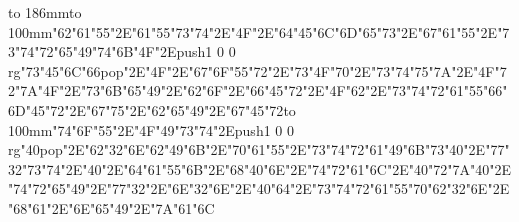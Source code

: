 \hbox to 186mm{\hsize=81mm\vbox to 100mm{\vfill\ipa\char"62\ipa\char"61\ipa\char"55\ipa\char"2E\ipa\char"61\ipa\char"55\ipa\char"73\ipa\char"74\ipa\char"2E\ipa\char"4F\ipa\char"2E\ipa\char"64\ipa\char"45\ipa\char"6C\medskip\ipa\char"6D\ipa\char"65\ipa\char"73\ipa\char"2E\ipa\char"67\ipa\char"61\ipa\char"55\ipa\char"2E\ipa\char"73\ipa\char"74\ipa\char"72\ipa\char"65\ipa\char"49\ipa\char"74\medskip\ipa\char"6B\ipa\char"4F\ipa\char"2E\pdfcolorstack\match push{1 0 0 rg}\ipa\char"73\ipa\char"45\ipa\char"6C\ipa\char"66\pdfcolorstack\match pop{}\ipa\char"2E\ipa\char"4F\ipa\char"2E\ipa\char"67\ipa\char"6F\ipa\char"55\ipa\char"72\ipa\char"2E\ipa\char"73\ipa\char"4F\ipa\char"70\ipa\char"2E\ipa\char"73\ipa\char"74\ipa\char"75\ipa\char"7A\ipa\char"2E\ipa\char"4F\ipa\char"72\ipa\char"7A\medskip\ipa\char"4F\ipa\char"2E\ipa\char"73\ipa\char"6B\ipa\char"65\ipa\char"49\ipa\char"2E\ipa\char"62\ipa\char"6F\ipa\char"2E\ipa\char"66\ipa\char"45\ipa\char"72\ipa\char"2E\ipa\char"4F\ipa\char"62\ipa\char"2E\ipa\char"73\ipa\char"74\ipa\char"72\ipa\char"61\ipa\char"55\ipa\char"66\medskip\ipa\char"6D\ipa\char"45\ipa\char"72\ipa\char"2E\ipa\char"67\ipa\char"75\ipa\char"2E\ipa\char"62\ipa\char"65\ipa\char"49\ipa\char"2E\ipa\char"67\ipa\char"45\ipa\char"72\vfill}\hfill\vbox to 100mm{\vfill\ipa\char"74\ipa\char"6F\ipa\char"55\ipa\char"2E\ipa\char"4F\ipa\char"49\ipa\char"73\ipa\char"74\ipa\char"2E\pdfcolorstack\match push{1 0 0 rg}\ipa\char"40\pdfcolorstack\match pop{}\ipa\char"2E\ipa\char"62\ipa\char"32\ipa\char"6E\medskip\ipa\char"62\ipa\char"49\ipa\char"6B\ipa\char"2E\ipa\char"70\ipa\char"61\ipa\char"55\ipa\char"2E\ipa\char"73\ipa\char"74\ipa\char"72\ipa\char"61\ipa\char"49\ipa\char"6B\medskip\ipa\char"73\ipa\char"40\ipa\char"2E\ipa\char"77\ipa\char"32\ipa\char"73\ipa\char"74\ipa\char"2E\ipa\char"40\ipa\char"2E\ipa\char"64\ipa\char"61\ipa\char"55\ipa\char"6B\ipa\char"2E\ipa\char"68\ipa\char"40\ipa\char"6E\ipa\char"2E\ipa\char"74\ipa\char"72\ipa\char"61\ipa\char"6C\ipa\char"2E\ipa\char"40\ipa\char"72\ipa\char"7A\medskip\ipa\char"40\ipa\char"2E\ipa\char"74\ipa\char"72\ipa\char"65\ipa\char"49\ipa\char"2E\ipa\char"77\ipa\char"32\ipa\char"2E\ipa\char"6E\ipa\char"32\ipa\char"6E\ipa\char"2E\ipa\char"40\ipa\char"64\ipa\char"2E\ipa\char"73\ipa\char"74\ipa\char"72\ipa\char"61\ipa\char"55\ipa\char"70\medskip\ipa\char"62\ipa\char"32\ipa\char"6E\ipa\char"2E\ipa\char"68\ipa\char"61\ipa\char"2E\ipa\char"6E\ipa\char"65\ipa\char"49\ipa\char"2E\ipa\char"7A\ipa\char"61\ipa\char"6C\vfill}}\eject
